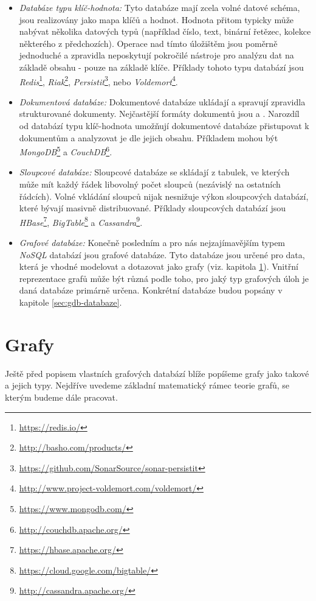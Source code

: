 \begin{itemize}
  \item{\textit{Databáze typu klíč-hodnota:}} Tyto databáze mají zcela volné datové schéma, jsou realizovány jako mapa klíčů a hodnot. Hodnota přitom typicky může nabývat několika datových typů (například číslo, text, binární řetězec, kolekce některého z předchozích). Operace nad tímto úložištěm jsou poměrně jednoduché a zpravidla neposkytují pokročilé nástroje pro analýzu dat na základě obsahu - pouze na základě klíče. Příklady tohoto typu databází jsou \textit{Redis}\footnote{\url{https://redis.io/}}, \textit{Riak}\footnote{\url{http://basho.com/products/}}, \textit{Persistit}\footnote{\url{https://github.com/SonarSource/sonar-persistit}}, nebo \textit{Voldemort}\footnote{\url{http://www.project-voldemort.com/voldemort/}}.
  \item{\textit{Dokumentová databáze:}} Dokumentové databáze ukládají a spravují zpravidla strukturované dokumenty. Nejčastější formáty dokumentů jsou \textit{} a \textit{}. Narozdíl od databází typu klíč-hodnota umožňují dokumentové databáze přistupovat k dokumentům a analyzovat je dle jejich obsahu. Příkladem mohou být \textit{MongoDB}\footnote{\url{https://www.mongodb.com/}} a \textit{CouchDB}\footnote{\url{http://couchdb.apache.org/}}.
  \item{\textit{Sloupcové databáze:}} Sloupcové databáze se skládají z tabulek, ve kterých může mít každý řádek libovolný počet sloupců (nezávislý na ostatních řádcích). Volné vkládání sloupců nijak nesnižuje výkon sloupcových databází, které bývají masivně distribuované. Příklady sloupcových databází jsou \textit{HBase}\footnote{\url{https://hbase.apache.org/}}, \textit{BigTable}\footnote{\url{https://cloud.google.com/bigtable/}} a \textit{Cassandra}\footnote{\url{http://cassandra.apache.org/}}.
  \item{\textit{Grafové databáze:}} Konečně posledním a pro nás nejzajímavějším typem \textit{NoSQL} databází jsou grafové databáze. Tyto databáze jsou určené pro data, která je vhodné modelovat a dotazovat jako grafy (viz. kapitola \ref{sec:gdb-grafy}). Vnitřní reprezentace grafů může být různá podle toho, pro jaký typ grafových úloh je daná databáze primárně určena. Konkrétní databáze budou popsány v kapitole \ref{sec:gdb-databaze}.
\end{itemize}


\section{Grafy}
\label{sec:gdb-grafy}
Ještě před popisem vlastních grafových databází blíže popíšeme grafy jako takové a jejich typy. Nejdříve uvedeme základní matematický rámec teorie grafů, se kterým budeme dále pracovat.

